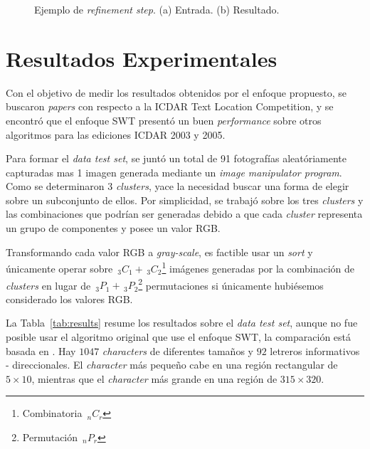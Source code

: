 \begin{figure}[h!]
  \centering
  \setlength{\fboxsep}{0pt}
	\caption[Ejemplo de \textit{refinement step}]{Ejemplo de \textit{refinement 
	step}. (a) Entrada. (b) Resultado.}
  \label{Fig:cap-resultados:refinement}
\end{figure}

\newcommand{\nPr}[2]{\,_{#1}P_{#2}} %
\newcommand{\nCr}[2]{\,_{#1}C_{#2}} %
\section{Resultados Experimentales}
Con el objetivo de medir los resultados obtenidos por el enfoque propuesto, se 
buscaron \textit{papers} con respecto a la ICDAR Text Location Competition, y se
encontró que el enfoque SWT presentó un buen \textit{performance} sobre otros
algoritmos para las ediciones ICDAR 2003 y 2005.

Para formar el \textit{data test set}, se juntó un total de 91 fotografías 
aleatóriamente capturadas mas 1 imagen generada mediante un \textit{image
manipulator program}. Como se determinaron 3 \textit{clusters}, yace la
necesidad buscar una forma de elegir sobre un subconjunto de ellos. Por
simplicidad, se trabajó sobre los tres \textit{clusters} y las combinaciones que
podrían ser generadas debido a que cada \textit{cluster} representa un grupo de
componentes y posee un valor RGB.

Transformando cada valor RGB a \textit{gray-scale}, es factible usar un 
\textit{sort} y únicamente operar sobre $\nCr{3}{1} +
\nCr{3}{2}$\footnote{Combinatoria $\nCr{n}{r}$} imágenes generadas por la
combinación de \textit{clusters} en lugar de  $\nPr{3}{1} +
\nPr{3}{2}$\footnote{Permutación $\nPr{n}{r}$} permutaciones si únicamente
hubiésemos considerado los valores RGB.

La Tabla~\ref{tab:results} resume los resultados sobre el \textit{data test
set}, aunque no fue posible usar el algoritmo original que use el enfoque SWT,
la comparación está basada en \cite{Saurav:SWT:2010}. Hay $1047$
\textit{characters} de diferentes tamaños y $92$ letreros informativos -
direccionales. El \textit{character} más pequeño cabe en una región rectangular
de $5\times 10$, mientras que el \textit{character} más grande en una región de
$315 \times 320$.


